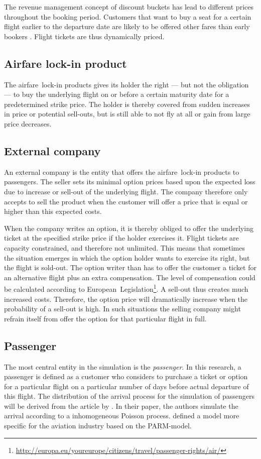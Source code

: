 The revenue management concept of discount buckets has lead to different prices throughout the booking period. Customers that want to buy a seat for a certain flight earlier to the departure date are likely to be offered other fares than early bookers . Flight tickets are thus dynamically priced.

\subsection{Airfare lock-in product}
The airfare~lock-in products gives its holder the right --- but not the obligation --- to buy the underlying flight on or before a certain maturity date for a predetermined strike price. The holder is thereby covered from sudden increases in price or potential sell-outs, but is still able to not fly at all or gain from large price decreases.

\subsection{External company}
An external company is the entity that offers the airfare~lock-in products to passengers. The seller sets its minimal option prices based upon the expected loss due to increase or sell-out of the underlying flight. The company therefore only accepts to sell the product when the customer will offer a price that is equal or higher than this expected costs.

When the company writes an option, it is thereby obliged to offer the underlying ticket at the specified strike price if the holder exercises it. Flight tickets are capacity constrained, and therefore not unlimited. This means that sometimes the situation emerges in which the option holder wants to exercise its right, but the flight is sold-out. The option writer than has to offer the customer a ticket for an alternative flight plus an extra compensation. The level of compensation could be calculated according to European~Legislation\footnote{\url{http://europa.eu/youreurope/citizens/travel/passenger-rights/air/}}. A sell-out thus creates much increased costs. Therefore, the option price will dramatically increase when the probability of a sell-out is high. In such situations the selling company might refrain itself from offer the option for that particular flight in full.

\subsection{Passenger}
\label{sec:Passenger}
The most central entity in the simulation is the \emph{passenger}.  In this research, a passenger is defined as a customer who considers to purchase a ticket or option for a particular flight on a particular number of days before actual departure of this flight. The distribution of the arrival process for the simulation of passengers will be derived from the article by . In their paper, the authors simulate the arrival according to a inhomogeneous Poisson process.  defined a model more specific for the aviation industry based on the PARM-model.

